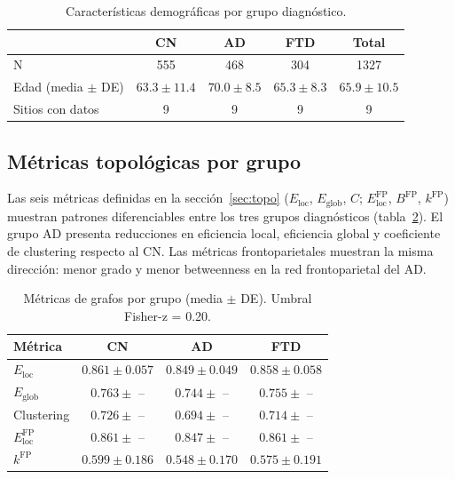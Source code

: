 \documentclass[12pt,a4paper]{article}
\begin{document}
\begin{table}[H]
  \centering
  \caption{Características demográficas por grupo diagnóstico.}
  \label{tab:demograficos}
  \begin{tabular}{lcccc}
    \toprule
    & CN & AD & FTD & Total \\
    \midrule
    N & 555 & 468 & 304 & 1327 \\
    Edad (media $\pm$ DE) & $63.3 \pm 11.4$ & $70.0 \pm 8.5$ & $65.3 \pm 8.3$ & $65.9 \pm 10.5$ \\
    Sitios con datos & 9 & 9 & 9 & 9 \\
    \bottomrule
  \end{tabular}
\end{table}

\subsection{Métricas topológicas por grupo}

Las seis métricas definidas en la sección~\ref{sec:topo} ($E_{\text{loc}}$, $E_{\text{glob}}$,
$C$; $E_{\text{loc}}^{\text{FP}}$, $B^{\text{FP}}$, $k^{\text{FP}}$) muestran patrones
diferenciables entre los tres grupos diagnósticos (tabla~\ref{tab:grafos}). El grupo AD presenta
reducciones en eficiencia local, eficiencia global y coeficiente de clustering respecto al CN.
Las métricas frontoparietales muestran la misma dirección: menor grado y menor betweenness
en la red frontoparietal del AD.

\begin{table}[H]
  \centering
  \caption{Métricas de grafos por grupo (media $\pm$ DE). Umbral Fisher-z = 0.20.}
  \label{tab:grafos}
  \begin{tabular}{lccc}
    \toprule
    Métrica & CN & AD & FTD \\
    \midrule
    $E_{\text{loc}}$ & $0.861 \pm 0.057$ & $0.849 \pm 0.049$ & $0.858 \pm 0.058$ \\
    $E_{\text{glob}}$ & $0.763 \pm$ -- & $0.744 \pm$ -- & $0.755 \pm$ -- \\
    Clustering & $0.726 \pm$ -- & $0.694 \pm$ -- & $0.714 \pm$ -- \\
    $E_{\text{loc}}^{\text{FP}}$ & $0.861 \pm$ -- & $0.847 \pm$ -- & $0.861 \pm$ -- \\
    $k^{\text{FP}}$ & $0.599 \pm 0.186$ & $0.548 \pm 0.170$ & $0.575 \pm 0.191$ \\
    \bottomrule
  \end{tabular}
\end{table}
\end{document}
